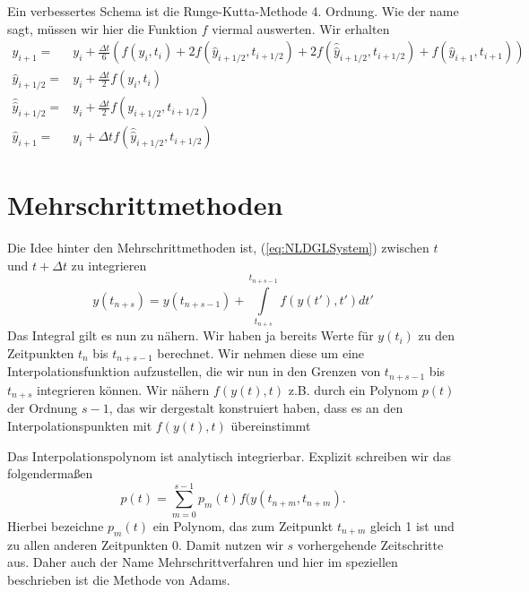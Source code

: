 Ein verbessertes Schema ist die Runge-Kutta-Methode 4. Ordnung. Wie der name
sagt, müssen wir hier die  Funktion $f$ viermal auswerten. Wir erhalten
\begin{align}\label{eq:RK4order}
  y_{i+1} =& y_{i}+\frac{\Delta t}{6}\left( 
    f(y_i,t_i)+2f(\hat{y}_{i+1/2},t_{i+1/2})+2f(\hat{\hat{y}}_{i+1/2},t_{i+1/2})
  +f(\hat{y}_{i+1},t_{i+1})\right)\\
  \hat{y}_{i+1/2}=&y_i+\frac{\Delta t}{2}f(y_{i},t_{i})\nonumber\\
  \hat{\hat{y}}_{i+1/2}=&y_i+\frac{\Delta t}{2}f(y_{i+1/2},t_{i+1/2})\nonumber\\
  \hat{y}_{i+1}=&y_i+\Delta tf(\hat{\hat{y}}_{i+1/2},t_{i+1/2})\nonumber
\end{align}

\section{Mehrschrittmethoden}
Die Idee hinter den Mehrschrittmethoden ist, (\ref{eq:NLDGLSystem}) zwischen
$t$ und $t+\Delta t$ zu integrieren
\begin{equation*}
y(t_{n+s})=y(t_{n+s-1})+\int\limits_{t_{n+s}}^{t_{n+s-1}}f(y(t'),t')dt'
\end{equation*}
Das Integral gilt es nun zu nähern. Wir haben ja bereits Werte für $y(t_i)$ zu
den Zeitpunkten $t_n$  bis $t_{n+s-1}$ berechnet. Wir nehmen  diese um eine
Interpolationsfunktion aufzustellen, die wir nun in den Grenzen von $t_{n+s-1}$
bis $t_{n+s}$ integrieren können. Wir nähern $f(y(t),t)$ z.B. durch ein
Polynom $p(t)$ der Ordnung $s-1$, das wir dergestalt konstruiert haben, dass es an
den Interpolationspunkten mit $f(y(t),t)$ übereinstimmt

Das Interpolationspolynom ist analytisch integrierbar.  Explizit schreiben wir
das folgendermaßen
\[ p(t)=\sum\limits_{m=0}^{s-1}p_m(t)f(y(t_{n+m},t_{n+m}). \]
Hierbei bezeichne $p_m(t)$ ein Polynom, das zum Zeitpunkt $t_{n+m}$ gleich 1
ist und zu allen anderen Zeitpunkten 0. Damit nutzen wir $s$ vorhergehende
Zeitschritte aus. Daher auch der Name Mehrschrittverfahren und hier im
speziellen beschrieben ist die Methode von Adams.
